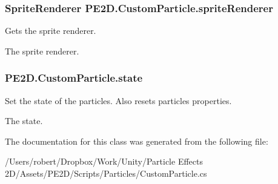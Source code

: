 \subsubsection[{sprite\+Renderer}]{\setlength{\rightskip}{0pt plus 5cm}Sprite\+Renderer P\+E2\+D.\+Custom\+Particle.\+sprite\+Renderer\hspace{0.3cm}{\ttfamily [get]}}\label{class_p_e2_d_1_1_custom_particle_a6a116a174bdc1007d31528712f19aa7f}


Gets the sprite renderer. 

The sprite renderer.\hypertarget{class_p_e2_d_1_1_custom_particle_a70eb3430c0338b4c69e7f90206814e08}{}
\subsubsection[{state}]{ P\+E2\+D.\+Custom\+Particle.\+state\hspace{0.3cm}{\ttfamily [set]}}\label{class_p_e2_d_1_1_custom_particle_a70eb3430c0338b4c69e7f90206814e08}


Set the state of the particles. Also resets particles properties. 

The state.

The documentation for this class was generated from the following file\+:\begin{DoxyCompactItemize}
\item 
/\+Users/robert/\+Dropbox/\+Work/\+Unity/\+Particle Effects 2\+D/\+Assets/\+P\+E2\+D/\+Scripts/\+Particles/Custom\+Particle.\+cs\end{DoxyCompactItemize}

